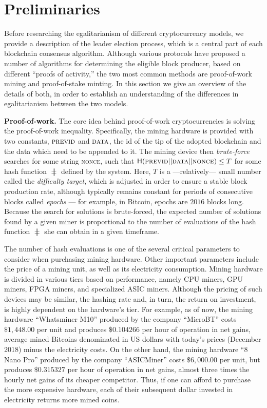 \section{Preliminaries}\label{sec:preliminaries}

Before researching the egalitarianism of different cryptocurrency models, we
provide a description of the leader election process, which is a central part
of each blockchain consensus algorithm. Although various protocols have
proposed a number of algorithms for determining the eligible block producer,
based on different ``proofs of activity,'' the two most common methods are
proof-of-work mining and proof-of-stake minting. In this section we give an
overview of the details of both, in order to establish an understanding of the
differences in egalitarianism between the two models.

\noindent\textbf{Proof-of-work.}
The core idea behind proof-of-work cryptocurrencies is solving the
proof-of-work inequality.  Specifically, the mining hardware is provided with
two constants, $\textsc{previd}$ and $\textsc{data}$, \ie the id of the
tip of the adopted blockchain and the data which need to be appended to it.  The mining
device then \emph{brute-force} searches for some string \textsc{nonce}, such
that $\mathsf{H}(\textsc{previd} || \textsc{data} || \textsc{nonce}) \leq T$ for
some hash function $\hash$ defined by the system. Here, $T$ is a
---relatively--- small number called the \emph{difficulty target}, which is
adjusted in order to ensure a stable block production rate, although typically
remains constant for periods of consecutive blocks called \emph{epochs} --- for
example, in Bitcoin, epochs are $2016$ blocks long. Because the search for
solutions is brute-forced, the expected number of solutions found by a given
miner is proportional to the number of evaluations of the
hash function $\hash$ she can obtain in a given timeframe.

The number of hash evaluations is one of the several critical parameters to
consider when purchasing mining hardware. Other important parameters include
the price of a mining unit, as well as its electricity consumption.  Mining
hardware is divided in various tiers based on performance, namely CPU miners,
GPU miners, FPGA miners, and specialized ASIC miners.  Although the pricing of
such devices may be similar, the hashing rate and, in turn, the return on
investment, is highly dependent on the hardware's tier.  For example, as of
now, the mining hardware ``Whatsminer M10'' produced by the company ``MicroBT''
costs $\$1{,}448.00$ per unit and produces $\$0.104266$ per hour of operation in
net gains, \ie average mined Bitcoins denominated in US dollars with today's
prices (December 2018) minus the electricity costs. On the other hand, the
mining hardware ``8 Nano Pro'' produced by the company ``ASICMiner'' costs
$\$6{,}000.00$ per unit, but produces $\$0.315327$ per hour of operation in net
gains, \ie almost three times the hourly net gains of its cheaper competitor.
Thus, if one can afford to purchase the more expensive hardware, each of their
subsequent dollar invested in electricity returns more mined coins.

